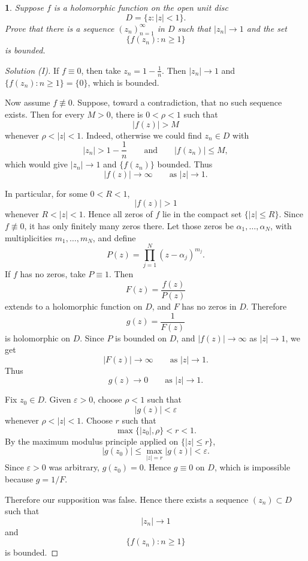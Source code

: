 \documentclass[12pt, a4paper]{report}
\theoremstyle{spaced}
\newtheorem{exercise}{}
\begin{document}
\begin{exercise}
	Suppose $f$ is a holomorphic function on the open unit disc
	\[
		D=\{z:|z|<1\}.
	\]
	Prove that there is a sequence $(z_n)_{n=1}^{\infty}$ in $D$ such that $|z_n|\to 1$ and the set
	\[
		\{f(z_n):n\geq 1\}
	\]
	is bounded.
\end{exercise}
\begin{proof}[Solution (I)]
	If \(f\equiv 0\), then take \(z_n=1-\frac1n\). Then \(|z_n|\to 1\) and
	\(\{f(z_n):n\ge 1\}=\{0\}\), which is bounded.

	Now assume \(f\not\equiv 0\). Suppose, toward a contradiction, that no such
	sequence exists. Then for every \(M>0\), there is \(0<\rho<1\) such that
	\[
		|f(z)|>M
	\]
	whenever \(\rho<|z|<1\). Indeed, otherwise we could find \(z_n\in D\) with
	\[
		|z_n|>1-\frac1n
		\qquad\text{and}\qquad
		|f(z_n)|\le M,
	\]
	which would give \(|z_n|\to 1\) and \(\{f(z_n)\}\) bounded.
	Thus
	\[
		|f(z)|\to \infty
		\qquad \text{as } |z|\to 1.
	\]

	In particular, for some \(0<R<1\),
	\[
		|f(z)|>1
	\]
	whenever \(R<|z|<1\). Hence all zeros of \(f\) lie in the compact set
	\(\{|z|\le R\}\). Since \(f\not\equiv 0\), it has only finitely many zeros
	there. Let those zeros be \(\alpha_1,\dots,\alpha_N\), with multiplicities
	\(m_1,\dots,m_N\), and define
	\[
		P(z)=\prod_{j=1}^N (z-\alpha_j)^{m_j}.
	\]
	If \(f\) has no zeros, take \(P\equiv 1\).
	Then
	\[
		F(z)=\frac{f(z)}{P(z)}
	\]
	extends to a holomorphic function on \(D\), and \(F\) has no zeros in \(D\).
	Therefore
	\[
		g(z)=\frac1{F(z)}
	\]
	is holomorphic on \(D\).
	Since \(P\) is bounded on \(D\), and \(|f(z)|\to\infty\) as \(|z|\to 1\), we get
	\[
		|F(z)|\to\infty
		\qquad \text{as } |z|\to 1.
	\]
	Thus
	\[
		g(z)\to 0
		\qquad \text{as } |z|\to 1.
	\]

	Fix \(z_0\in D\). Given \(\varepsilon>0\), choose \(\rho<1\) such that
	\[
		|g(z)|<\varepsilon
	\]
	whenever \(\rho<|z|<1\). Choose \(r\) such that
	\[
		\max\{|z_0|,\rho\}<r<1.
	\]
	By the maximum modulus principle applied on \(\{|z|\le r\}\),
	\[
		|g(z_0)|\le \max_{|z|=r}|g(z)|<\varepsilon.
	\]
	Since \(\varepsilon>0\) was arbitrary, \(g(z_0)=0\). Hence \(g\equiv 0\) on
	\(D\), which is impossible because \(g=1/F\).

	Therefore our supposition was false. Hence there exists a sequence
	\((z_n)\subset D\) such that
	\[
		|z_n|\to 1
	\]
	and
	\[
		\{f(z_n):n\ge 1\}
	\]
	is bounded.
\end{proof}
\end{document}
